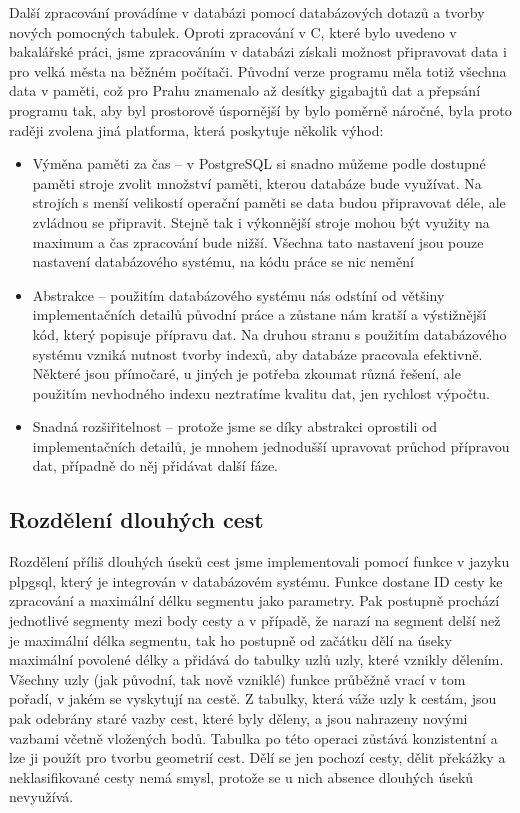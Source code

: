 Další zpracování provádíme v databázi pomocí databázových dotazů a tvorby nových
pomocných tabulek. Oproti zpracování v C, které bylo uvedeno v bakalářské práci,
jsme zpracováním v databázi získali možnost připravovat data i pro velká města
na běžném počítači. Původní verze programu měla totiž všechna data v paměti, což
pro Prahu znamenalo až desítky gigabajtů dat a přepsání programu tak, aby byl
prostorově úspornější by bylo poměrně náročné, byla proto raději zvolena jiná
platforma, která poskytuje několik výhod:
\begin{itemize}
	\item Výměna paměti za čas -- v PostgreSQL si snadno můžeme podle
	dostupné paměti stroje zvolit množství paměti, kterou databáze bude
	využívat. Na strojích s menší velikostí operační paměti se data budou
	připravovat déle, ale zvládnou se připravit. Stejně tak i výkonnější
	stroje mohou být využity na maximum a čas zpracování bude nižší. Všechna
	tato nastavení jsou pouze nastavení databázového systému, na kódu práce
	se nic nemění
	\item Abstrakce -- použitím databázového systému nás odstíní od většiny
	implementačních detailů původní práce a zůstane nám kratší a výstižnější
	kód, který popisuje přípravu dat. Na druhou stranu s použitím
	databázového systému vzniká nutnost tvorby indexů, aby databáze
	pracovala efektivně. Některé jsou přímočaré, u jiných je potřeba zkoumat
	různá řešení, ale použitím nevhodného indexu neztratíme kvalitu dat, jen
	rychlost výpočtu. 
	\item Snadná rozšiřitelnost -- protože jsme se díky abstrakci oprostili
	od implementačních detailů, je mnohem jednodušší upravovat průchod
	přípravou dat, případně do něj přidávat další fáze.
\end{itemize}

\subsection{Rozdělení dlouhých cest}
Rozdělení příliš dlouhých úseků cest jsme implementovali pomocí funkce v jazyku
plpgsql, který je integrován v databázovém systému. Funkce dostane ID cesty ke
zpracování a maximální délku segmentu jako parametry. Pak postupně prochází
jednotlivé segmenty mezi body cesty a v případě, že narazí na segment delší než
je maximální délka segmentu, tak ho postupně od začátku dělí na úseky maximální
povolené délky a přidává do tabulky uzlů uzly, které vznikly dělením. Všechny
uzly (jak původní, tak nově vzniklé) funkce průběžně vrací v tom pořadí, v jakém
se vyskytují na cestě. Z tabulky, která váže uzly k cestám, jsou pak odebrány
staré vazby cest, které byly děleny, a jsou nahrazeny novými vazbami včetně
vložených bodů. Tabulka po této operaci zůstává konzistentní a lze ji použít pro
tvorbu geometrií cest. Dělí se jen pochozí cesty, dělit překážky a
neklasifikované cesty nemá smysl, protože se u nich absence dlouhých úseků
nevyužívá.

